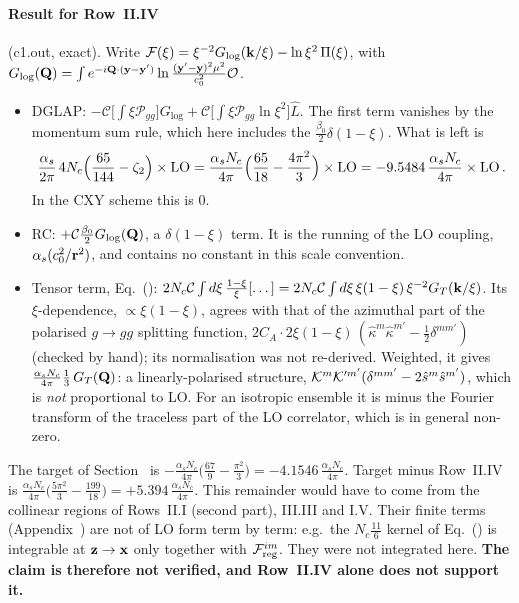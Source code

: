 \paragraph{Result for Row~II.IV} (c1.out, exact). Write $\mathcal F(\xi)=\xi^{-2}G_{\log}(\mathbf{k}/\xi)-\ln\xi^2\,\Pi(\xi)$, with $G_{\log}(\mathbf{Q})=\int e^{-i\mathbf{Q}\cdot(\mathbf{y}-\mathbf{y}')}\ln\frac{(\mathbf{y}'-\mathbf{y})^2\mu^2}{c_0^2}\mathcal O$.
\begin{itemize}
\item DGLAP: $-\mathcal C\big[\int\xi\mathcal P_{gg}\big]G_{\log}+\mathcal C\big[\int\xi\mathcal P_{gg}\ln\xi^2\big]\widehat L$. The first term vanishes by the momentum sum rule, which here includes the $\frac{\beta_0}{2}\delta(1-\xi)$. What is left is
\[
\frac{\alpha_s}{2\pi}\,4N_c\Big(\frac{65}{144}-\zeta_2\Big)\times{\rm LO}=\frac{\alpha_sN_c}{4\pi}\Big(\frac{65}{18}-\frac{4\pi^2}{3}\Big)\times{\rm LO}=-9.5484\,\frac{\alpha_sN_c}{4\pi}\times{\rm LO}\,.
\]
In the CXY scheme this is $0$.
\item RC: $+\mathcal C\frac{\beta_0}{2}G_{\log}(\mathbf{Q})$, a $\delta(1-\xi)$ term. It is the running of the LO coupling, $\alpha_s(c_0^2/\mathbf{r}^2)$, and contains no constant in this scale convention.
\item Tensor term, Eq.~(): $2N_c\mathcal C\int d\xi\,\frac{1-\xi}{\xi}[\dots]=2N_c\mathcal C\int d\xi\,\xi(1-\xi)\,\xi^{-2}G_T(\mathbf{k}/\xi)$. Its $\xi$-dependence, $\propto\xi(1-\xi)$, agrees with that of the azimuthal part of the polarised $g\to gg$ splitting function, $2C_A\cdot2\xi(1-\xi)\,(\hat\kappa^m\hat\kappa^{m'}-\frac12\delta^{mm'})$ (checked by hand); its normalisation was not re-derived. Weighted, it gives $\frac{\alpha_sN_c}{4\pi}\frac13\,G_T(\mathbf{Q})$: a linearly-polarised structure, $\mathcal{K}^m\mathcal{K}'^{m'}(\delta^{mm'}-2\hat s^m\hat s^{m'})$, which is \emph{not} proportional to LO. For an isotropic ensemble it is minus the Fourier transform of the traceless part of the LO correlator, which is in general non-zero.
\end{itemize}
The target of Section~ is $-\frac{\alpha_sN_c}{4\pi}\big(\frac{67}{9}-\frac{\pi^2}{3}\big)=-4.1546\,\frac{\alpha_sN_c}{4\pi}$. Target minus Row~II.IV is $\frac{\alpha_sN_c}{4\pi}\big(\frac{5\pi^2}{3}-\frac{199}{18}\big)=+5.394\,\frac{\alpha_sN_c}{4\pi}$. This remainder would have to come from the collinear regions of Rows~II.I (second part), III.III and I.V. Their finite terms (Appendix~) are not of LO form term by term: e.g.\ the $N_c\frac{11}{6}$ kernel of Eq.~() is integrable at $\mathbf{z}\to\mathbf{x}$ only together with $\mathcal F^{im}_{\rm reg}$. They were not integrated here. \textbf{The claim is therefore not verified, and Row~II.IV alone does not support it.}

